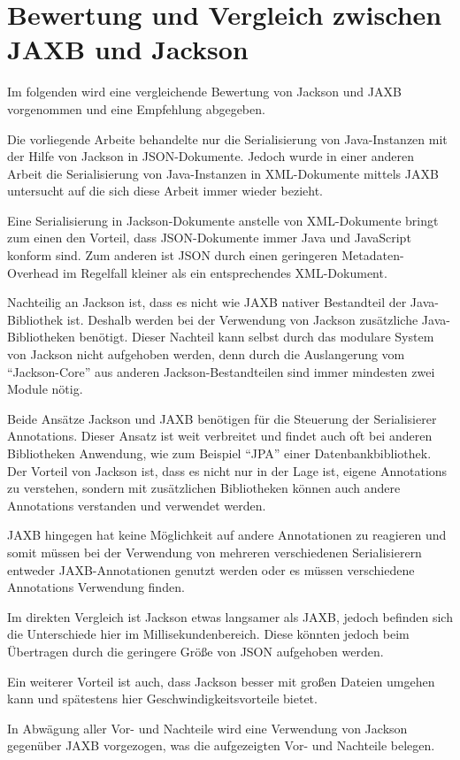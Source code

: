 \section{Bewertung und Vergleich zwischen JAXB und Jackson}
Im folgenden wird eine vergleichende Bewertung von Jackson und JAXB vorgenommen und eine Empfehlung abgegeben.

Die vorliegende Arbeite behandelte nur die Serialisierung von Java-Instanzen mit der Hilfe von Jackson in \ac{JSON}-Dokumente. Jedoch wurde in einer anderen Arbeit die Serialisierung von Java-Instanzen in XML-Dokumente mittels JAXB untersucht auf die sich diese Arbeit immer wieder bezieht.\cite{Wal14}

Eine Serialisierung in Jackson-Dokumente anstelle von XML-Dokumente bringt zum einen den Vorteil, dass \ac{JSON}-Dokumente immer Java und JavaScript konform sind. Zum anderen ist \ac{JSON} durch einen geringeren Metadaten-Overhead im Regelfall kleiner als ein entsprechendes XML-Dokument. 

Nachteilig an Jackson ist, dass es nicht wie JAXB nativer Bestandteil der Java-Bibliothek ist. Deshalb werden bei der Verwendung von Jackson zus\"atzliche Java-Bibliotheken ben\"otigt. Dieser Nachteil kann selbst durch das modulare System von Jackson nicht aufgehoben werden, denn durch die Auslangerung vom "`Jackson-Core"' aus anderen Jackson-Bestandteilen sind immer mindesten zwei Module n\"otig. 

Beide Ans\"atze Jackson und JAXB ben\"otigen f\"ur die Steuerung der Serialisierer Annotations. Dieser Ansatz ist weit verbreitet und findet auch oft bei anderen Bibliotheken Anwendung, wie zum Beispiel "`JPA"' einer Datenbankbibliothek. Der Vorteil von Jackson ist, dass es nicht nur in der Lage ist, eigene Annotations zu verstehen, sondern mit zus\"atzlichen Bibliotheken k\"onnen auch andere Annotations verstanden und verwendet werden. 

JAXB hingegen hat keine M\"oglichkeit auf andere Annotationen zu reagieren und somit m\"ussen bei der Verwendung von mehreren verschiedenen Serialisierern entweder JAXB-Annotationen genutzt werden oder es m\"ussen verschiedene Annotations Verwendung finden.

Im direkten Vergleich ist Jackson etwas langsamer als JAXB, jedoch befinden sich die Unterschiede hier im Millisekundenbereich. Diese k\"onnten jedoch beim \"Ubertragen durch die geringere Gr\"o\ss{}e von \ac{JSON} aufgehoben werden.

Ein weiterer Vorteil ist auch, dass Jackson besser mit gro\ss{}en Dateien umgehen kann und sp\"atestens hier Geschwindigkeitsvorteile bietet.

In Abw\"agung aller Vor- und Nachteile wird eine Verwendung von Jackson gegen\"uber JAXB vorgezogen, was die aufgezeigten Vor- und Nachteile belegen.